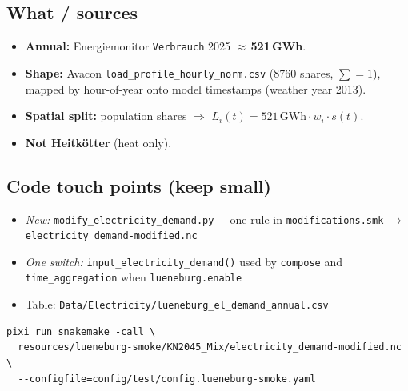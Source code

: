 \documentclass[11pt,a4paper]{article}
\begin{document}
\noindent{}

\vspace{0.8em}

\subsection{What / sources}
\begin{itemize}[leftmargin=*]
  \item \textbf{Annual:} Energiemonitor \texttt{Verbrauch} 2025 $\approx$\,\textbf{521\,GWh}.
  \item \textbf{Shape:} Avacon \texttt{load\_profile\_hourly\_norm.csv} (8760 shares, $\sum=1$),
        mapped by hour-of-year onto model timestamps (weather year 2013).
  \item \textbf{Spatial split:} population shares
        $\Rightarrow$ $L_i(t)=521\,\mathrm{GWh}\cdot w_i\cdot s(t)$.
  \item \textbf{Not Heitkötter} (heat only).
\end{itemize}

\subsection{Code touch points (keep small)}
\begin{itemize}[leftmargin=*]
  \item \emph{New:} \texttt{modify\_electricity\_demand.py} + one rule in
        \texttt{modifications.smk} $\to$ \texttt{electricity\_demand-modified.nc}
  \item \emph{One switch:} \texttt{input\_electricity\_demand()} used by
        \texttt{compose} and \texttt{time\_aggregation} when \texttt{lueneburg.enable}
  \item Table: \texttt{Data/Electricity/lueneburg\_el\_demand\_annual.csv}
\end{itemize}

\begin{lstlisting}
pixi run snakemake -call \
  resources/lueneburg-smoke/KN2045_Mix/electricity_demand-modified.nc \
  --configfile=config/test/config.lueneburg-smoke.yaml
\end{lstlisting}
\end{document}
